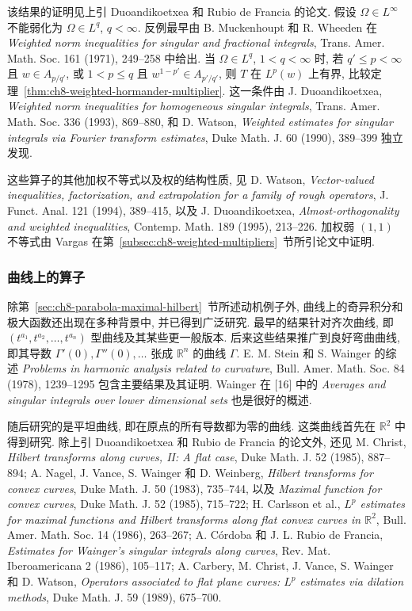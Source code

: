 该结果的证明见上引 Duoandikoetxea 和 Rubio de Francia 的论文. 假设 $\Omega\in L^\infty$ 不能弱化为 $\Omega\in L^q$, $q<\infty$. 反例最早由 B. Muckenhoupt 和 R. Wheeden 在 \textit{Weighted norm inequalities for singular and fractional integrals}, Trans. Amer. Math. Soc. 161 (1971), 249--258 中给出. 当 $\Omega\in L^q$, $1<q<\infty$ 时, 若 $q'\le p<\infty$ 且 $w\in A_{p/q'}$, 或 $1<p\le q$ 且 $w^{1-p'}\in A_{p'/q'}$, 则 $T$ 在 $L^p(w)$ 上有界, 比较定理~\ref{thm:ch8-weighted-hormander-multiplier}. 这一条件由 J. Duoandikoetxea, \textit{Weighted norm inequalities for homogeneous singular integrals}, Trans. Amer. Math. Soc. 336 (1993), 869--880, 和 D. Watson, \textit{Weighted estimates for singular integrals via Fourier transform estimates}, Duke Math. J. 60 (1990), 389--399 独立发现.

\hypertarget{chapter-08-page-205}{}
这些算子的其他加权不等式以及权的结构性质, 见 D. Watson, \textit{Vector-valued inequalities, factorization, and extrapolation for a family of rough operators}, J. Funct. Anal. 121 (1994), 389--415, 以及 J. Duoandikoetxea, \textit{Almost-orthogonality and weighted inequalities}, Contemp. Math. 189 (1995), 213--226. 加权弱 $(1,1)$ 不等式由 Vargas 在第~\ref{subsec:ch8-weighted-multipliers}~节所引论文中证明.

\subsubsection{曲线上的算子}
\label{subsec:ch8-operators-curves}

除第~\ref{sec:ch8-parabola-maximal-hilbert}~节所述动机例子外, 曲线上的奇异积分和极大函数还出现在多种背景中, 并已得到广泛研究. 最早的结果针对齐次曲线, 即 $(t^{a_1},t^{a_2},\ldots,t^{a_n})$ 型曲线及其某些更一般版本. 后来这些结果推广到良好弯曲曲线, 即其导数 $\Gamma'(0),\Gamma''(0),\ldots$ 张成 $\mathbb R^n$ 的曲线 $\Gamma$. E. M. Stein 和 S. Wainger 的综述 \textit{Problems in harmonic analysis related to curvature}, Bull. Amer. Math. Soc. 84 (1978), 1239--1295 包含主要结果及其证明. Wainger 在 [16] 中的 \textit{Averages and singular integrals over lower dimensional sets} 也是很好的概述.

随后研究的是平坦曲线, 即在原点的所有导数都为零的曲线. 这类曲线首先在 $\mathbb R^2$ 中得到研究. 除上引 Duoandikoetxea 和 Rubio de Francia 的论文外, 还见 M. Christ, \textit{Hilbert transforms along curves, II: A flat case}, Duke Math. J. 52 (1985), 887--894; A. Nagel, J. Vance, S. Wainger 和 D. Weinberg, \textit{Hilbert transforms for convex curves}, Duke Math. J. 50 (1983), 735--744, 以及 \textit{Maximal function for convex curves}, Duke Math. J. 52 (1985), 715--722; H. Carlsson et al., \textit{$L^p$ estimates for maximal functions and Hilbert transforms along flat convex curves in $\mathbb R^2$}, Bull. Amer. Math. Soc. 14 (1986), 263--267; A. Córdoba 和 J. L. Rubio de Francia, \textit{Estimates for Wainger's singular integrals along curves}, Rev. Mat. Iberoamericana 2 (1986), 105--117; A. Carbery, M. Christ, J. Vance, S. Wainger 和 D. Watson, \textit{Operators associated to flat plane curves: $L^p$ estimates via dilation methods}, Duke Math. J. 59 (1989), 675--700.

